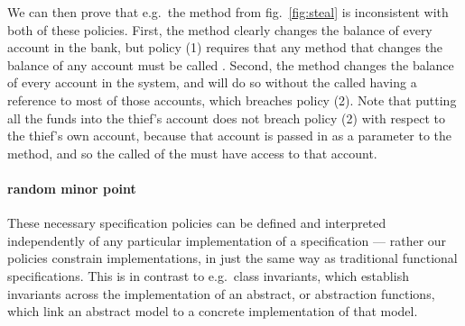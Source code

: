 
We can then prove that e.g.\ the  method from
fig.~\ref{fig:steal} is inconsistent with both of these policies.
First, the  method clearly changes the balance of
every account in the bank, but policy (1) requires that any method
that changes the balance of any account must be called .
Second, the  method changes the balance of every account in
the system, and will do so without the called having a reference to
most of those accounts, which breaches policy (2).   Note
that  putting all the funds into the thief's account
does not breach policy (2) with respect to the thief's own account,
because that account is passed in as a parameter to the 
method, and so the called of the  must have access to that
account.


\paragraph{random minor point}

These necessary specification policies
can be defined and interpreted independently of any particular
implementation of a specification --- rather our policies constrain
implementations, in just the same way as traditional functional
specifications.  This is in contrast to e.g.\ class invariants, which
establish invariants across the implementation of an abstract, or
abstraction functions, which link an abstract model to a concrete
implementation of that model. 
